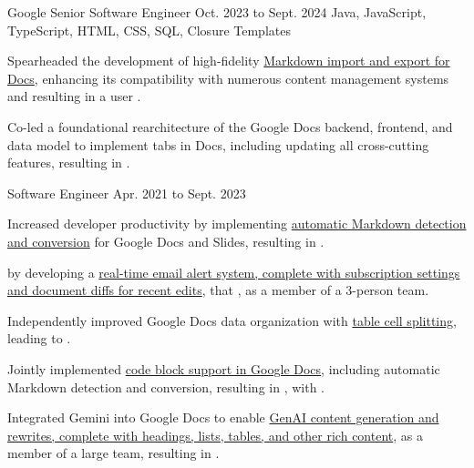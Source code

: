 \begin{cventry}
    {Google}
    {Senior Software Engineer}
    {Oct. 2023 to Sept. 2024}
    {Java, JavaScript, TypeScript, HTML, CSS, SQL, Closure Templates}
    \begin{cvitems}
        \item Spearheaded the development of high-fidelity \href{https://workspaceupdates.googleblog.com/2024/07/import-and-export-markdown-in-google-docs.html}{Markdown import and export for Docs}, enhancing its compatibility with numerous content management systems and resulting in a user . 
        \item Co-led a foundational rearchitecture of the Google Docs backend, frontend, and data model to implement tabs in Docs, including updating all cross-cutting features, resulting in .
    \end{cvitems}
\end{cventry}

\begin{cventry}
    {}
    {Software Engineer}
    {Apr. 2021 to Sept. 2023}{}
    \begin{cvitems}
        \item Increased developer productivity by implementing \href{https://workspaceupdates.googleblog.com/2022/03/compose-with-markdown-in-google-docs-on.html}{automatic Markdown detection and conversion} for Google Docs and Slides, resulting in .
        \item {} by developing a \href{https://workspaceupdates.googleblog.com/2022/07/edit-notifications-for-document-content-changes.html}{real-time email alert system, complete with subscription settings and document diffs for recent edits}, that , as a member of a 3-person team.
        \item Independently improved Google Docs data organization with \href{https://workspaceupdates.googleblog.com/2022/10/split-table-cells-in-google-docs.html}{table cell splitting}, leading to .
        \item Jointly implemented \href{https://workspaceupdates.googleblog.com/2022/12/format-display-code-google-docs.html}{code block support in Google Docs}, including automatic Markdown detection and conversion, resulting in , with .
        \item Integrated Gemini into Google Docs to enable \href{https://workspace.google.com/blog/product-announcements/generative-ai}{GenAI content generation and rewrites, complete with headings, lists, tables, and other rich content}, as a member of a large team, resulting in .
    \end{cvitems}
\end{cventry}

